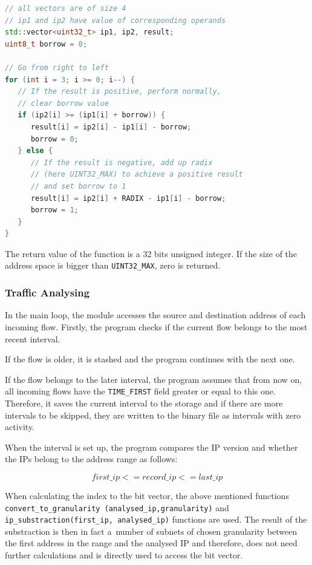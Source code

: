 \begin{lstlisting}[label={lst:substraction},captionpos=b, caption={N-base Substraction},language=C++]
// all vectors are of size 4
// ip1 and ip2 have value of corresponding operands 
std::vector<uint32_t> ip1, ip2, result;
uint8_t borrow = 0;

// Go from right to left
for (int i = 3; i >= 0; i--) {
   // If the result is positive, perform normally,
   // clear borrow value
   if (ip2[i] >= (ip1[i] + borrow)) {
      result[i] = ip2[i] - ip1[i] - borrow;
      borrow = 0;
   } else {
      // If the result is negative, add up radix 
      // (here UINT32_MAX) to achieve a positive result
      // and set borrow to 1
      result[i] = ip2[i] + RADIX - ip1[i] - borrow;
      borrow = 1;
   }
}
\end{lstlisting}

The return value of the function is a 32 bits unsigned integer.
If the size of the address space is bigger than \texttt{UINT32\_MAX}, zero
is returned.

\subsubsection{Traffic Analysing}
In the main loop, the module accesses the source and destination address of
each incoming flow. Firstly, the program checks if the current flow belongs
to the most recent interval.

If the flow is older, it is stashed and the program continues with the next one.

If the flow belongs to the later interval, the program assumes that from now on,
all incoming flows have the \texttt{TIME\_FIRST} field greater or equal to this one.
Therefore, it saves the current interval to the storage and if there are
more intervals to be skipped, they are written to the binary file as
intervals with zero activity.

When the interval is set up, the program compares the IP version and
whether the IPs belong to the address range as follows: 

\begin{equation}\label{equ:range}
   first\_ip <= record\_ip <= last\_ip
\end{equation}

When calculating the index to the bit vector, the above mentioned functions
\texttt{convert\_to\_\-granularity (analysed\_ip,\-granularity)} and
\texttt{ip\_substraction(first\_ip, analysed\_\-ip)}
functions are used. The result of the substraction is then in fact a~number of subnets
of chosen granularity between the first address in the range and the analysed IP and
therefore, does not need further calculations and is directly used to access the bit vector.


